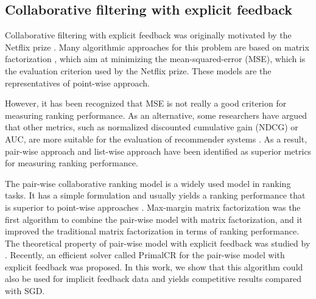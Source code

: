 \documentclass{article}
\numberwithin{equation}{section}
\newtheorem{sampling strategy}{Sampling Strategy}
\begin{document}
\subsection{Collaborative filtering with explicit feedback}


Collaborative filtering with explicit feedback was originally motivated by the Netflix prize \cite{netflix}. Many algorithmic approaches for this problem are based on matrix factorization \cite{pmf,korenmf,sideinformation}, which aim at minimizing the mean-squared-error (MSE), which is the evaluation criterion used by the Netflix prize. These models are the representatives of point-wise approach.

However, it has been recognized that MSE is not really a good criterion for measuring ranking performance. As an alternative, some researchers have argued that other metrics, such as normalized discounted cumulative gain (NDCG) or AUC, are more suitable for the evaluation of recommender systems \cite{collaborativeranking}. As a result, pair-wise approach and list-wise approach have been identified as superior metrics for measuring ranking performance. 

The pair-wise collaborative ranking model is a widely used model in ranking tasks. It has a simple formulation and usually yields a ranking performance that is superior to point-wise approaches \cite{bpr, cr, crlinear}. 
Max-margin matrix factorization \cite{maxmargin} was the first algorithm to combine the pair-wise model with matrix factorization, and it improved the traditional matrix factorization in terms of ranking performance. The theoretical property of pair-wise model with explicit feedback was studied by \cite{cr,pcfpr}. Recently, an efficient solver called \textsf{PrimalCR} \cite{crlinear} for the pair-wise model with explicit feedback was proposed. In this work, we show that this algorithm could also be used for implicit feedback data and yields competitive results compared with SGD.
\end{document}
